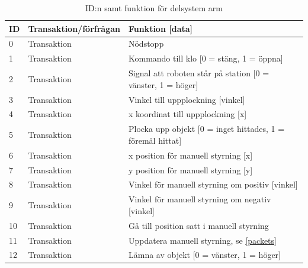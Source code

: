 \begin{table}[H]
\centering
\label{callbacks-arm}
\begin{tabularx}{\textwidth}{|l|l|X|}
\hline
\textbf{ID} & \textbf{Transaktion/förfrågan} & \textbf{Funktion [data]} \\ \hline
0 & Transaktion & Nödstopp \\ \hline
1 & Transaktion & Kommando till klo [0 = stäng, 1 = öppna] \\ \hline
2 & Transaktion & Signal att roboten står på station [0 = vänster, 1 = höger] \\ \hline
3 & Transaktion & Vinkel till uppplockning [vinkel] \\ \hline
4 & Transaktion & x koordinat till uppplockning [x] \\ \hline
5 & Transaktion & Plocka upp objekt [0 = inget hittades, 1 = föremål hittat] \\ \hline
6 & Transaktion & x position för manuell styrning [x] \\ \hline
7 & Transaktion & y position för manuell styrning [y] \\ \hline
8 & Transaktion & Vinkel för manuell styrning om positiv [vinkel] \\ \hline
9 & Transaktion & Vinkel för manuell styrning om negativ [vinkel] \\ \hline
10 & Transaktion & Gå till position satt i manuell styrning \\ \hline
11 & Transaktion & Uppdatera manuell styrning, se \ref{packets} \\ \hline
12 & Transaktion & Lämna av objekt [0 = vänster, 1 = höger] \\ \hline
\end{tabularx}
\caption{ID:n samt funktion för delsystem arm}
\end{table}

